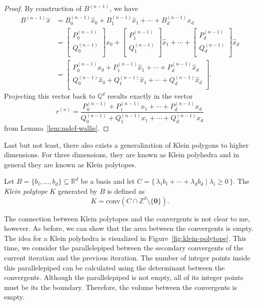 \begin{proof}
  By construction of $B^{(n-1)}$, we have
  \begin{align*}
    B^{(n-1)} \hat x
    & = B_0^{(n-1)} \hat x_0 + B_1^{(n-1)} \hat x_1 + ⋯ + B_d^{(n-1)} x_d \\
    & =
    \begin{bmatrix}
      P_0^{(n-1)} \\
      Q_0^{(n-1)} \\
    \end{bmatrix} \hat x_0
    + \begin{bmatrix}
      P_1^{(n-1)} \\
      Q_1^{(n-1)} \\
    \end{bmatrix} \hat x_1
    + ⋯ + \begin{bmatrix}
      P_d^{(n-1)} \\
      Q_d^{(n-1)} \\
    \end{bmatrix} \hat x_d \\
    & = \begin{bmatrix}
      P_0^{(n-1)} \hat x_0 + P_1^{(n-1)} \hat x_1 + ⋯ + P_d^{(n-1)} \hat x_d \\
      Q_0^{(n-1)} \hat x_0 + Q_1^{(n-1)} \hat x_1 + ⋯ + Q_d^{(n-1)} \hat x_d \\
    \end{bmatrix}.
  \end{align*}
  Projecting this vector back to $ℚ^d$ results exactly in the vector
  \[
    r^{(n)} = \frac{P_0^{(n-1)} + P_1^{(n-1)} x_1 + ⋯ + P_d^{(n-1)} x_d}{Q_0^{(n-1)} + Q_1^{(n-1)} x_1 + ⋯ + Q_d^{(n-1)} x_d}
  \]
  from
  Lemma~\ref{lem:mdcf-wallis}.
\end{proof}

\iffalse
Last but not least,
there also exists a generalization of Klein polygons to higher dimensions.
For three dimensions, they are known as Klein polyhedra
and in general they are known as Klein polytopes.

\begin{definition}
  Let $B = \{b₁, …, b_d\} ⊆ ℝ^d$ be a basis and let $C = \{\, λ₁ b₁ + ⋯ + λ_d b_d \mid λ_i ≥ 0 \,\}$.
  The \emph{Klein polytope} $K$ generated by $B$ is defined as
  \[
    K = \mathrm{conv}(C ∩ ℤ^d \setminus \{\symbf 0\}).
  \]
\end{definition}

The connection between Klein polytopes and the convergents is not clear to me, however.
As before, we can show that the area between the convergents is empty.
The idea for a Klein polyhedra is visualized in Figure~\ref{fig:klein-polytope}.
This time, we consider the parallelepiped between the secondary convergents of the
current iteration and the previous iteration.
The number of integer points inside this parallelepiped can be calculated using
the determinant between the convergents.
Although the parallelepiped is not empty,
all of its integer points must be its the boundary.
Therefore, the volume between the convergents is empty.

